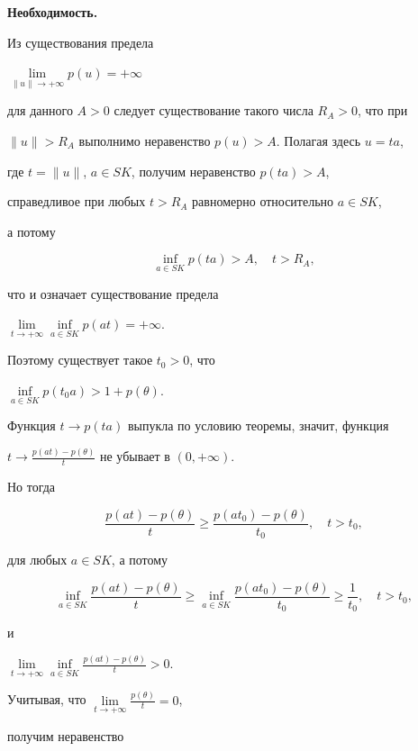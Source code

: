 \begin{pf} {\bf Необходимость.}


Из существования предела


$\lim\limits_{\|u\| \to +\infty} p(u)= +\infty$


для данного $A>0$ следует существование такого числа $R_A >0$, что при


$\|u\| > R_A$ выполнимо неравенство $p(u) > A$. Полагая здесь $u=ta$,


где $t=\|u\|$, $a \in SK$, получим неравенство $p(ta) > A$,


справедливое при любых $t>R_A$ равномерно относительно $a \in SK$,


а потому


$$


\inf_{a \in SK} p(ta) > A, \quad t> R_A,


$$


что и означает существование предела


$\lim\limits_{t \to +\infty} \inf\limits_{a \in SK} p(at) = +\infty$.


Поэтому существует такое $t_0>0$, что


$\inf\limits_{a \in SK} p(t_0a) > 1 + p(\theta )$.


Функция $t \to p(ta)$ выпукла по условию теоремы, значит, функция


$t \to \frac {p(at)-p(\theta )}{t}$ не убывает в $(0,+\infty)$.


Но тогда


$$


\frac {p(at)-p(\theta)} {t} \ge \frac {p(at_0)-p(\theta )}{ t_0},


\quad t > t_0,


$$


для любых $a \in SK$, а потому


$$


\inf_{a \in SK}\frac{ p(at)-p(\theta )}{t} \ge


\inf_{a \in SK}\frac {p(at_0)-p(\theta )}{ t_0} \ge


\frac {1}{t_0}, \quad t > t_0,


$$


и


$\lim\limits_{t \to +\infty}


\inf\limits_{a \in SK} \frac {p(at)-p(\theta )}{ t}> 0$.


Учитывая, что $\lim\limits_{t \to +\infty}\frac {p(\theta)}{t}=0$,


получим неравенство



\end{pf}
